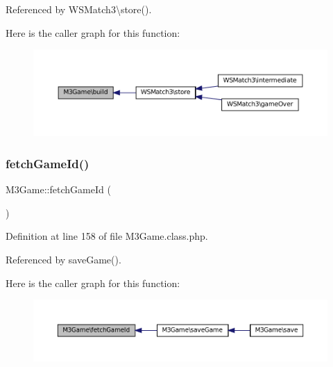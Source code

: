 Referenced by W\+S\+Match3\textbackslash{}store().

Here is the caller graph for this function\+:\nopagebreak
\begin{figure}[H]
\begin{center}
\leavevmode
\includegraphics[width=350pt]{class_m3_game_a14b38fdf7f73b3947f039fd8e6fc2cce_icgraph}
\end{center}
\end{figure}
\mbox{\label{class_m3_game_aade0085d4c6ad8e99e1f60886029f63a}} 
\subsubsection{\texorpdfstring{fetch\+Game\+Id()}{fetchGameId()}}
{\footnotesize\ttfamily M3\+Game\+::fetch\+Game\+Id (\begin{DoxyParamCaption}{ }\end{DoxyParamCaption})\hspace{0.3cm}{\ttfamily [private]}}



Definition at line 158 of file M3\+Game.\+class.\+php.



Referenced by save\+Game().

Here is the caller graph for this function\+:\nopagebreak
\begin{figure}[H]
\begin{center}
\leavevmode
\includegraphics[width=350pt]{class_m3_game_aade0085d4c6ad8e99e1f60886029f63a_icgraph}
\end{center}
\end{figure}
\mbox{\label{class_m3_game_a518b82c571e5b00f48e3898b948cfdc1}} 
